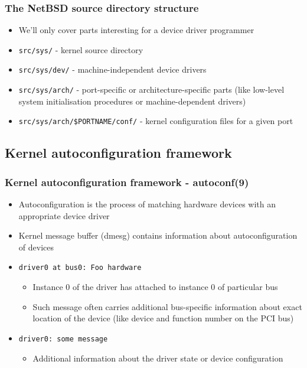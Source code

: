 \documentclass[dvipsnames,table]{beamer}
\begin{document}
\begin{frame}
\frametitle{The NetBSD source directory structure}
\begin{itemize}
	\item We'll only cover parts interesting for a device driver programmer
	\item {\tt src/sys/} - kernel source directory
	\item {\tt src/sys/dev/} - machine-independent device drivers
	\item {\tt src/sys/arch/} - port-specific or architecture-specific parts (like low-level system initialisation procedures or machine-dependent drivers)
	\item {\tt src/sys/arch/\$PORTNAME/conf/} - kernel configuration files for a given port

\end{itemize}
\end{frame}

\subsection{Kernel autoconfiguration framework}

\begin{frame}
\frametitle{Kernel autoconfiguration framework - autoconf(9)}
\begin{itemize}
	\item Autoconfiguration is the process of matching hardware devices with an
     appropriate device driver
    \item Kernel message buffer (dmesg) contains information about autoconfiguration of devices
    \item {\tt driver0 at bus0: Foo hardware} 
    \begin{itemize}
    	\item Instance 0 of the driver has attached to instance 0 of particular bus
		\item Such message often carries additional bus-specific information about exact location of the device (like device and function number on the PCI bus)
	\end{itemize}
    \item {\tt driver0: some message}
    \begin{itemize}
    	\item Additional information about the driver state or device configuration
	\end{itemize}
\end{itemize}
\end{frame}
\end{document}
